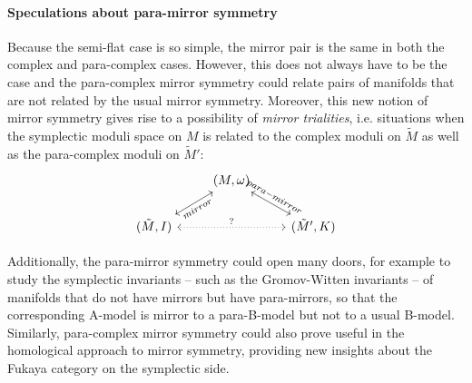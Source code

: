 \documentclass[letterpaper,12pt]{article}
\newcommand{\Mt}{\tl{M}}
\def\tl{\tilde}
\theoremstyle{definition}
\theoremstyle{remark}
\theoremstyle{examples}
\begin{document}
\paragraph{Speculations about para-mirror symmetry}
Because the semi-flat case is so simple, the mirror pair is the same in both the complex and para-complex cases. However, this does not always have to be the case and the para-complex mirror symmetry could relate pairs of manifolds that are not related by the usual mirror symmetry. Moreover, this new notion of mirror symmetry gives rise to a possibility of {\it mirror trialities}, i.e. situations when the symplectic moduli space on $M$ is related to the complex moduli on $\Mt$ as well as the para-complex moduli on $\Mt'$:
\begin{equation*}
\begin{tikzcd}
& (M,\omega)\arrow[leftrightarrow,sloped,swap]{ld}{\mathclap{mirror}}\arrow[leftrightarrow,sloped]{rd}{\mathclap{para-mirror}}&\\
(\Mt,I)\arrow[leftrightarrow, dotted]{rr}{?}&&(\Mt',K)
\end{tikzcd}
\end{equation*}

Additionally, the para-mirror symmetry could open many doors, for example to study the symplectic invariants -- such as the Gromov-Witten invariants -- of manifolds that do not have mirrors but have para-mirrors, so that the corresponding A-model is mirror to a para-B-model but not to a usual B-model. Similarly, para-complex mirror symmetry could also prove useful in the homological approach to mirror symmetry, providing new insights about the Fukaya category on the symplectic side.

\appendix
\end{document}
